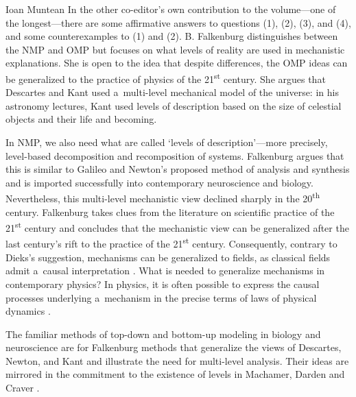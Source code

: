 \begin{recengenv}{Ioan Muntean}
In the other co-editor's own contribution to the volume---one of the longest---there are some affirmative answers to questions (1), (2), (3), and (4), and some counterexamples to (1) and (2). B. Falkenburg distinguishes between the NMP and OMP but focuses on what levels of reality are used in mechanistic explanations. She is open to the idea that despite differences, the OMP ideas can be generalized to the practice of physics of the 21\textsuperscript{st} century. She argues that Descartes and Kant used a~multi-level mechanical model of the universe: in his astronomy lectures, Kant used levels of description based on the size of celestial objects and their life and becoming.

In NMP, we also need what are called ‘levels of description'---more precisely, level-based decomposition and recomposition of systems. Falkenburg argues that this is similar to Galileo and Newton's proposed method of analysis and synthesis and is imported successfully into contemporary neuroscience and biology. Nevertheless, this multi-level mechanistic view declined sharply in the 20\textsuperscript{th} century. Falkenburg takes clues from the literature on scientific practice of the 21\textsuperscript{st} century and concludes that the mechanistic view can be generalized after the last century's rift to the practice of the 21\textsuperscript{st} century. Consequently, contrary to Dieks's suggestion, mechanisms can be generalized to fields, as classical fields admit a~causal interpretation
\parencites[][p.239]{salmon_scientific_1984}[referred at:][p.72]{falkenburg_mechanistic_2019}. %
 What is needed to generalize mechanisms in contemporary physics? In physics, it is often possible to express the causal processes underlying a~mechanism in the precise terms of laws of physical dynamics 
\parencite*[][p.73]{falkenburg_mechanistic_2019}.%


The familiar methods of top-down and bottom-up modeling in biology and neuroscience are for Falkenburg methods that generalize the views of Descartes, Newton, and Kant and illustrate the need for multi-level analysis. Their ideas are mirrored in the commitment to the existence of levels in Machamer, Darden and Craver \parencite*{machamer_thinking_2000}.


\end{recengenv}
